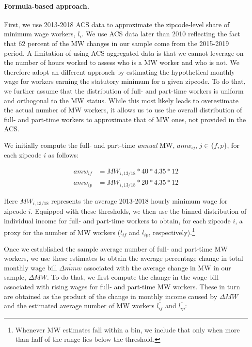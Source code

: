 \paragraph{Formula-based approach.}
First, we use 2013-2018 ACS data to approximate the zipcode-level share of minimum wage 
workers, $l_{i}$. We use ACS data later than 2010 reflecting the fact that 62 percent of the 
MW changes in our sample come from the 2015-2019 period. A limitation of using ACS 
aggregated data is that we cannot leverage on the number of hours worked to assess who is a 
MW worker and who is not. We therefore adopt an different approach by estimating the hypothetical 
monthly wage for workers earning the statutory minimum for a given zipcode. To do that, 
we further assume that the distribution of full- and part-time workers is uniform and orthogonal 
to the MW status. While this most likely leads to overestimate the actual number of MW workers, 
it allows us to use the overall distribution of full- and part-time workers to 
approximate that of MW ones, not provided in the ACS. 

We initially compute the full- and part-time \textit{annual} MW, $amw_{ij}$, $j\in \{f, p\}$, 
for each zipcode $i$ as follows: 

\begin{align}
	amw_{if} &= MW_{i, 13/18} * 40 * 4.35 * 12 \\
	amw_{ip} &= MW_{i, 13/18} * 20 * 4.35 * 12
\end{align}

Here $MW_{i, 13/18}$ represents the average 2013-2018 hourly minimum wage for 
zipcode $i$. Equipped with these thresholds, we then use the binned distribution of individual income for 
full- and part-time workers to obtain, for each zipcode $i$, a proxy for the number of MW workers 
($l_{if}$ and $l_{ip}$, respectively).\footnote{Whenever MW estimates fall within a bin, we include 
	that only when more than half of the range lies below the threshold.} 

Once we established the sample average number of full- and part-time MW workers, we use 
these estimates to obtain the average percentage change in total monthly wage bill $\overline{\Delta mmw}$ 
associated with the average change in MW in our sample, $\overline{\Delta MW}$. To do that, we first 
compute the change in the wage bill associated with rising wages for full- and part-time MW workers. 
These in turn are obtained as the product of the change in monthly income caused by $\overline{\Delta MW}$ 
and the estimated average number of MW workers $\overline{l_{if}}$ and $\overline{l_{ip}}$: 

